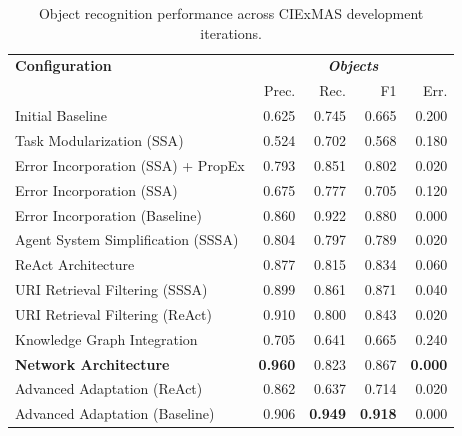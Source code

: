 \documentclass[a4paper,oneside,bibliography=totoc]{scrbook}
\begin{document}
\begin{table}[h]
  \centering
  \begin{tabular}{p{6cm}|rrrr}
    \toprule
    \textbf{Configuration}                       & \multicolumn{4}{c}{\textit{\textbf{Objects}}}                                                    \\
                                                 & Prec.                                         & Rec.           & F1             & Err.           \\
    \midrule
    Initial Baseline                             & 0.625                                         & 0.745          & 0.665          & 0.200          \\
    Task Modularization (\ac{SSA})               & 0.524                                         & 0.702          & 0.568          & 0.180          \\
    Error Incorporation (\ac{SSA}) + \ac{PropEx} & 0.793                                         & 0.851          & 0.802          & 0.020          \\
    Error Incorporation (\ac{SSA})               & 0.675                                         & 0.777          & 0.705          & 0.120          \\
    Error Incorporation (Baseline)               & 0.860                                         & 0.922          & 0.880          & 0.000          \\
    Agent System Simplification (\ac{SSSA})      & 0.804                                         & 0.797          & 0.789          & 0.020          \\
    \ac{ReAct} Architecture                      & 0.877                                         & 0.815          & 0.834          & 0.060          \\
    \ac{URI} Retrieval Filtering (\ac{SSSA})     & 0.899                                         & 0.861          & 0.871          & 0.040          \\
    \ac{URI} Retrieval Filtering (\ac{ReAct})    & 0.910                                         & 0.800          & 0.843          & 0.020          \\
    Knowledge Graph Integration                  & 0.705                                         & 0.641          & 0.665          & 0.240          \\
    \textbf{Network Architecture}                & \textbf{0.960}                                & 0.823          & 0.867          & \textbf{0.000} \\
    Advanced Adaptation (\ac{ReAct})             & 0.862                                         & 0.637          & 0.714          & 0.020          \\
    Advanced Adaptation (Baseline)               & 0.906                                         & \textbf{0.949} & \textbf{0.918} & 0.000          \\
    \bottomrule
  \end{tabular}
  \caption{Object recognition performance across CIExMAS development iterations.}
  \label{tab:evaluation_objects_iterations}
\end{table}
\end{document}
